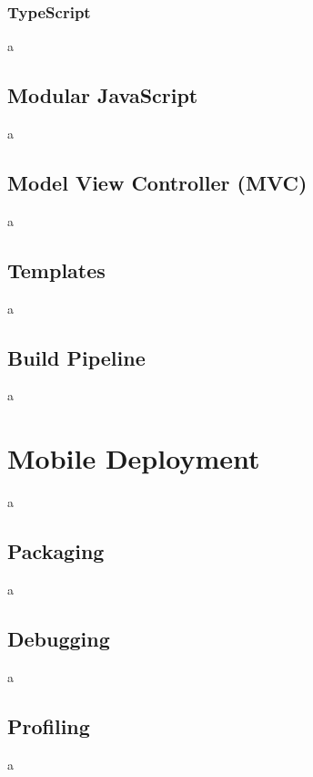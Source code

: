 \documentclass[final]{cmpreport}
\begin{document}
\subsubsection{TypeScript}
a

\subsection{Modular JavaScript}
a

\subsection{Model View Controller (MVC)}
a

\subsection{Templates}
a

\subsection{Build Pipeline}
a

\section{Mobile Deployment}
a

\subsection{Packaging}
a

\subsection{Debugging}
a

\subsection{Profiling}
a


\clearpage

\end{document}
